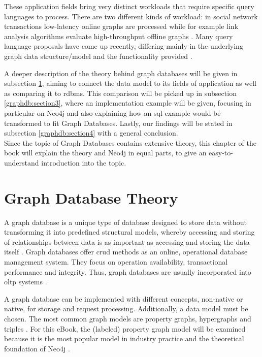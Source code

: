 These application fields bring very distinct workloads that require specific query languages to process. There are two different kinds of workload: in social network transactions low-latency online graphs are processed while for example link analysis algorithms evaluate high-throughput offline graphs \autocite{Angles2018AnIT}. Many query language proposals have come up recently, differing mainly in the underlying graph data structure/model and the functionality provided \autocite{Wood2012QueryLF}.

A deeper description of the theory behind graph databases will be given in subsection \ref{graphdb:section2}, aiming to connect the data model to its fields of application as well as comparing it to \gls{rdbms}. This comparison will be picked up in subsection \ref{graphdb:section3}, where an implementation example will be given, focusing in particular on Neo4j and also explaining how an \gls{sql} example would be transformed to fit Graph Databases. Lastly, our findings will be stated in subsection \ref{graphdb:section4} with a general conclusion. \\
Since the topic of Graph Databases contains extensive theory, this chapter of the book will explain the theory and Neo4j in equal parts, to give an easy-to-understand introduction into the topic.




\section{Graph Database Theory} \label{graphdb:section2}
A graph database is a unique type of database designed to store data without transforming it into predefined structural models, whereby accessing and storing of relationships between data is as important as accessing and storing the data itself \autocite{neo4j:graphdb}. Graph databases offer \gls{crud} methods as an online, operational database management system. They focus on operation availability, transactional performance and integrity. Thus, graph databases are usually incorporated into \gls{oltp} systems \autocite{graphdb2015}.

A graph database can be implemented with different concepts, non-native or native, for storage and request processing. Additionally, a data model must be chosen. The most common graph models are property graphs, hypergraphs and triples \autocite{graphdb2015}. For this eBook, the (labeled) property graph model will be examined because it is the most popular model in industry practice \autocite{graphdb2015} and the theoretical foundation of Neo4j \autocite{maheshlal2015}.


